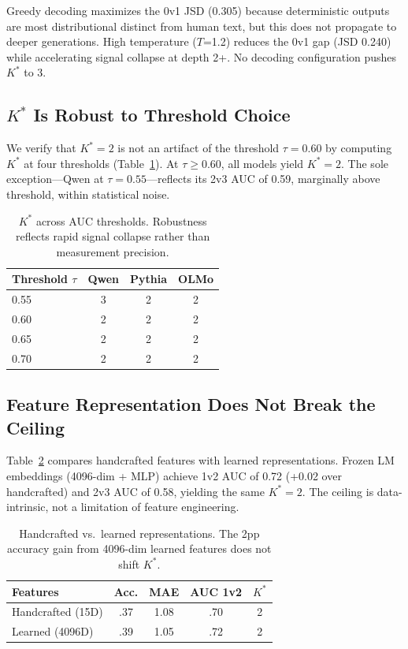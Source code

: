 \documentclass[11pt,a4paper]{article}
\begin{document}
Greedy decoding maximizes the 0v1 JSD (0.305) because deterministic outputs are most distributional distinct from human text, but this does not propagate to deeper generations.
High temperature ($T$=1.2) reduces the 0v1 gap (JSD 0.240) while accelerating signal collapse at depth 2+.
No decoding configuration pushes $K^*$ to 3.

\subsection{$K^*$ Is Robust to Threshold Choice}

We verify that $K^*=2$ is not an artifact of the threshold $\tau=0.60$ by computing $K^*$ at four thresholds (Table~\ref{tab:threshold}).
At $\tau \geq 0.60$, all models yield $K^*=2$.
The sole exception---Qwen at $\tau=0.55$---reflects its 2v3 AUC of 0.59, marginally above threshold, within statistical noise.

\begin{table}[t]
\centering
\small
\begin{tabular}{lccc}
\toprule
\textbf{Threshold $\tau$} & \textbf{Qwen} & \textbf{Pythia} & \textbf{OLMo} \\
\midrule
0.55 & 3 & 2 & 2 \\
0.60 & 2 & 2 & 2 \\
0.65 & 2 & 2 & 2 \\
0.70 & 2 & 2 & 2 \\
\bottomrule
\end{tabular}
\caption{$K^*$ across AUC thresholds. Robustness reflects rapid signal collapse rather than measurement precision.}
\label{tab:threshold}
\end{table}

\subsection{Feature Representation Does Not Break the Ceiling}

Table~\ref{tab:features} compares handcrafted features with learned representations.
Frozen LM embeddings (4096-dim + MLP) achieve 1v2 AUC of 0.72 (+0.02 over handcrafted) and 2v3 AUC of 0.58, yielding the same $K^*=2$.
The ceiling is data-intrinsic, not a limitation of feature engineering.

\begin{table}[t]
\centering
\small
\begin{tabular}{lcccc}
\toprule
\textbf{Features} & \textbf{Acc.} & \textbf{MAE} & \textbf{AUC 1v2} & \textbf{$K^*$} \\
\midrule
Handcrafted (15D) & .37 & 1.08 & .70 & 2 \\
Learned (4096D) & .39 & 1.05 & .72 & 2 \\
\bottomrule
\end{tabular}
\caption{Handcrafted vs.\ learned representations. The 2pp accuracy gain from 4096-dim learned features does not shift $K^*$.}
\label{tab:features}
\end{table}
\end{document}
